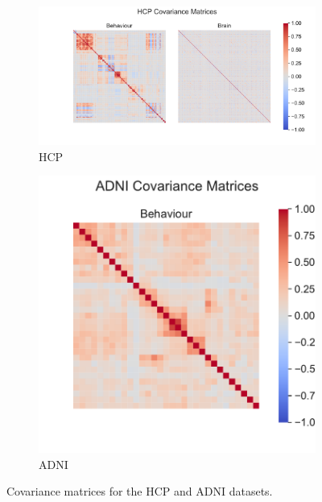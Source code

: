 \begin{figure}
\centering
\begin{subfigure}{0.66\linewidth}
\centering
\includegraphics[width=\linewidth]{figures/regularization/covariance/HCP_covariance}
\caption{HCP}
\end{subfigure}
%
\begin{subfigure}{0.33\linewidth}
\centering
\includegraphics[width=\linewidth]{figures/regularization/covariance/ADNI_covariance}
\caption{ADNI}
\end{subfigure}
\caption{Covariance matrices for the HCP and ADNI datasets.}
\label{fig:covariance-matrices-real}
\end{figure}

